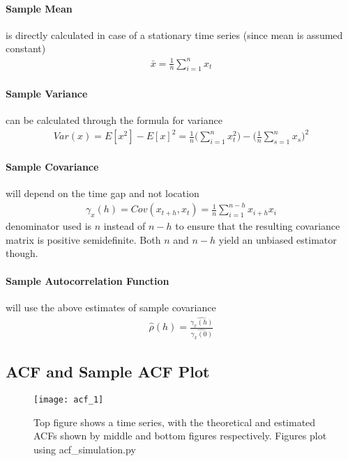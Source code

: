 \documentclass[../../time_series_notes.tex]{subfiles}
\begin{document}
\paragraph{Sample Mean} is directly calculated in case of a stationary time series (since mean is assumed constant)
\begin{align*}
    \bar{x} = \frac{1}{n} \sum_{i=1}^{n} x_{t}
\end{align*}
\paragraph{Sample Variance} can be calculated through the formula for variance
\begin{align*}
    Var(x) = E[x^{2}] - E[x]^{2} = \frac{1}{n} \bigg( \sum_{i=1}^{n} x_{t}^{2} \bigg) - \bigg( \frac{1}{n}\sum_{s=1}^{n}x_{s} \bigg)^{2}
\end{align*}
\paragraph{Sample Covariance} will depend on the time gap and not location
\begin{align*}
    \gamma_{x}(h) = Cov(x_{t+h},x_{t}) = \frac{1}{n}\sum_{i=1}^{n-h}x_{i+h}x_{i}
\end{align*}
denominator used is $n$ instead of $n-h$ to ensure that the resulting covariance matrix is positive semidefinite. Both $n$ and $n-h$ yield an unbiased estimator though.
\paragraph{Sample Autocorrelation Function} will use the above estimates of sample covariance
\begin{align*}
    \hat{\rho}(h) = \frac{\hat{\gamma_{x}(h)}}{\hat{\gamma_{x}(0)}}
\end{align*}

\subsection{ACF and Sample ACF Plot}
\begin{figure}[h]
    \texttt{[image: acf\_1]}
    \centering
    \caption {Top figure shows a time series, with the theoretical and estimated ACFs shown by middle and bottom figures respectively. Figures plot using acf\_simulation.py}
    \label{fig:acf_1} %
\end{figure}
\end{document}
